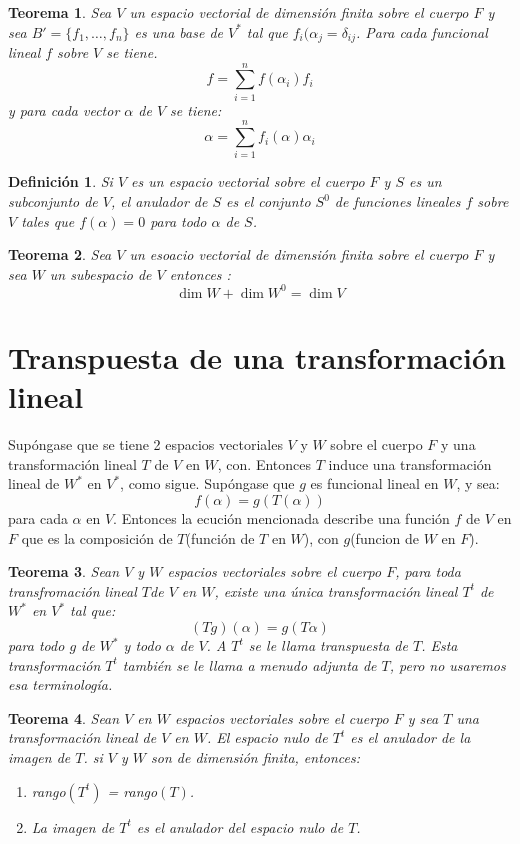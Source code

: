 \documentclass[b5paper, 11pt]{book}
\newcommand{\0}{\mathbf{0}}
\theoremstyle{estiloB}
\theoremstyle{estiloC}
\newtheorem{unteo}{Teorema}[chapter]
\newtheorem{unadefi}{Definición}[chapter]
\theoremstyle{estiloD}
\theoremstyle{estiloE}
\begin{document}
\begin{unteo}
Sea $V$ un espacio vectorial de dimensi\'on finita sobre el cuerpo $F$ y sea $B' = \{f_{1}, \ldots ,f_{n}\} $ es una base de $V^{*}$ tal que $f_{i}(\alpha_{j} = \delta_{ij}$. Para cada funcional lineal $f$ sobre $V$ se tiene.
\[
f = \sum_{i=1}^{n}f(\alpha_{i})f_{i}
\]
y para cada vector $\alpha$ de $V$ se tiene:
\[
\alpha = \sum_{i=1}^{n}f_{i}(\alpha)\alpha_{i}
\]
\end{unteo}
\begin{unadefi}
Si $V$ es un espacio vectorial sobre el cuerpo $F$ y $S$ es un subconjunto de $V$, el \textit{anulador} de $S$ es el conjunto $S^{0}$ de funciones lineales $f$ sobre $V$ tales que $f(\alpha) = 0$ para todo $\alpha$ de $S$.
\end{unadefi}

\begin{unteo}
Sea $V$ un esoacio vectorial de dimensi\'on finita sobre el cuerpo $F$ y sea $W$ un subespacio de $V$ entonces :
\[ \dim W + \dim W^{0}  = \dim V \]
\end{unteo}

\section{Transpuesta de una transformaci\'on lineal}
Supóngase que se tiene 2 espacios vectoriales $V$ y $W$ sobre el cuerpo $F$ y una transformaci\'on lineal $T$ de $V$ en $W$, con. Entonces $T$ induce una transformaci\'on lineal de $W^{*}$ en $V^{*}$, como sigue. Sup\'ongase que $g$ es funcional lineal en $W$, y sea:
\[
f(\alpha) = g(T(\alpha))
\]
para cada $\alpha$ en $V$. Entonces la ecuci\'on mencionada describe una funci\'on $f$ de $V$ en $F$ que es la composici\'on de $T$(funci\'on de $T$ en $W$), con $g$(funcion de $W$ en $F$).
\begin{unteo}
Sean $V$ y $W$ espacios vectoriales sobre el cuerpo $F$, para toda transfromaci\'on lineal $T$de $V$ en $W$, existe una \'unica transformaci\'on lineal $T^{t}$ de $W^{*}$ en $V^{*}$ tal que: 
\[
(Tg)(\alpha) = g(T\alpha)
\]
para todo $g$ de $W^{*}$ y todo $\alpha$ de $V$.
A $T^{t}$ se le llama \textit{transpuesta} de $T$. Esta transformaci\'on $T^{t}$ también se le llama a menudo adjunta de $T$, pero no usaremos esa terminolog\'ia.
\end{unteo}
\begin{unteo}
Sean $V$ en $W$ espacios vectoriales sobre el cuerpo $F$ y sea $T$ una transformaci\'on  lineal de $V$ en $W$. El espacio nulo de $T^{t}$ es el anulador de la imagen de $T$. si $V$ y $W$ son de dimensi\'on finita, entonces:
\begin{enumerate}
\item[i.] rango$(T^{t})$ = rango$(T)$.
\item[ii.] La imagen de $T^{t}$ es el anulador del espacio nulo de $T$.
\end{enumerate} 
\end{unteo}
\end{document}
